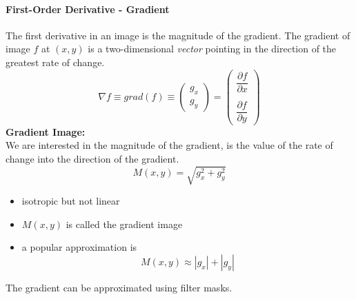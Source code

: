 \paragraph{First-Order Derivative - Gradient }
The first derivative in an image is the magnitude of the gradient.
The gradient of image $f$ at $(x,y)$ is a two-dimensional \emph{vector} pointing in the direction of the greatest rate of change.
\begin{equation}
\nabla f \equiv grad(f) \equiv \begin{pmatrix}g_x\\g_y\end{pmatrix} = \begin{pmatrix} \dfrac{\partial f}{\partial x} \\ \\ \dfrac{\partial f}{\partial y} \end{pmatrix}
\end{equation}
\textbf{Gradient Image:}\\
 We are interested in the magnitude of the gradient, is the value of the rate of change into the direction of the gradient.
\begin{equation}
M(x,y) = \sqrt{g_x^2 + g_y^2}
\end{equation}
\begin{itemize}
\item isotropic but not linear
\item $M(x,y)$ is called the gradient image
\item a popular approximation is 
  \[M(x,y) \approx |g_x| + |g_y|\]
\end{itemize}

The gradient can be approximated using filter masks.

